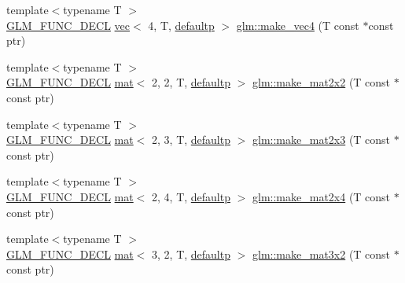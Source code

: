 \begin{DoxyCompactItemize}
\item 
{\footnotesize template$<$typename T $>$ }\\\mbox{\hyperlink{setup_8hpp_ab2d052de21a70539923e9bcbf6e83a51}{G\+L\+M\+\_\+\+F\+U\+N\+C\+\_\+\+D\+E\+CL}} \mbox{\hyperlink{structglm_1_1vec}{vec}}$<$ 4, T, \mbox{\hyperlink{namespaceglm_a36ed105b07c7746804d7fdc7cc90ff25a9d21ccd8b5a009ec7eb7677befc3bf51}{defaultp}} $>$ \mbox{\hyperlink{group__gtc__type__ptr_ga63f576518993efc22a969f18f80e29bb}{glm\+::make\+\_\+vec4}} (T const $\ast$const ptr)
\item 
{\footnotesize template$<$typename T $>$ }\\\mbox{\hyperlink{setup_8hpp_ab2d052de21a70539923e9bcbf6e83a51}{G\+L\+M\+\_\+\+F\+U\+N\+C\+\_\+\+D\+E\+CL}} \mbox{\hyperlink{structglm_1_1mat}{mat}}$<$ 2, 2, T, \mbox{\hyperlink{namespaceglm_a36ed105b07c7746804d7fdc7cc90ff25a9d21ccd8b5a009ec7eb7677befc3bf51}{defaultp}} $>$ \mbox{\hyperlink{group__gtc__type__ptr_gae49e1c7bcd5abec74d1c34155031f663}{glm\+::make\+\_\+mat2x2}} (T const $\ast$const ptr)
\item 
{\footnotesize template$<$typename T $>$ }\\\mbox{\hyperlink{setup_8hpp_ab2d052de21a70539923e9bcbf6e83a51}{G\+L\+M\+\_\+\+F\+U\+N\+C\+\_\+\+D\+E\+CL}} \mbox{\hyperlink{structglm_1_1mat}{mat}}$<$ 2, 3, T, \mbox{\hyperlink{namespaceglm_a36ed105b07c7746804d7fdc7cc90ff25a9d21ccd8b5a009ec7eb7677befc3bf51}{defaultp}} $>$ \mbox{\hyperlink{group__gtc__type__ptr_ga21982104164789cf8985483aaefc25e8}{glm\+::make\+\_\+mat2x3}} (T const $\ast$const ptr)
\item 
{\footnotesize template$<$typename T $>$ }\\\mbox{\hyperlink{setup_8hpp_ab2d052de21a70539923e9bcbf6e83a51}{G\+L\+M\+\_\+\+F\+U\+N\+C\+\_\+\+D\+E\+CL}} \mbox{\hyperlink{structglm_1_1mat}{mat}}$<$ 2, 4, T, \mbox{\hyperlink{namespaceglm_a36ed105b07c7746804d7fdc7cc90ff25a9d21ccd8b5a009ec7eb7677befc3bf51}{defaultp}} $>$ \mbox{\hyperlink{group__gtc__type__ptr_ga078b862c90b0e9a79ed43a58997d8388}{glm\+::make\+\_\+mat2x4}} (T const $\ast$const ptr)
\item 
{\footnotesize template$<$typename T $>$ }\\\mbox{\hyperlink{setup_8hpp_ab2d052de21a70539923e9bcbf6e83a51}{G\+L\+M\+\_\+\+F\+U\+N\+C\+\_\+\+D\+E\+CL}} \mbox{\hyperlink{structglm_1_1mat}{mat}}$<$ 3, 2, T, \mbox{\hyperlink{namespaceglm_a36ed105b07c7746804d7fdc7cc90ff25a9d21ccd8b5a009ec7eb7677befc3bf51}{defaultp}} $>$ \mbox{\hyperlink{group__gtc__type__ptr_ga27a24e121dc39e6857620e0f85b6e1a8}{glm\+::make\+\_\+mat3x2}} (T const $\ast$const ptr)

\end{DoxyCompactItemize}
